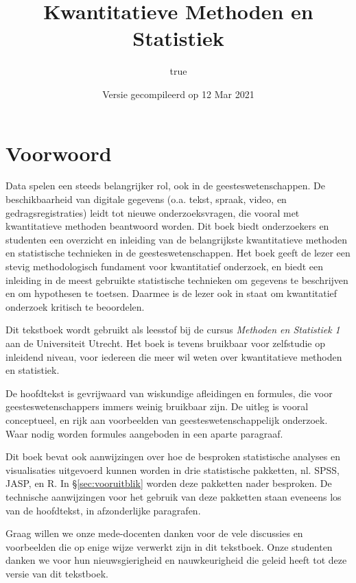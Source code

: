 \documentclass[
]{book}
\title{Kwantitatieve Methoden en Statistiek}
\author{true}
\date{Versie gecompileerd op 12 Mar 2021}
\begin{document}
\maketitle

{
\setcounter{tocdepth}{1}
\tableofcontents
}
\hypertarget{voorwoord}{%
\chapter*{Voorwoord}\label{voorwoord}}

Data spelen een steeds belangrijker rol, ook in de geesteswetenschappen.
De beschikbaarheid van digitale gegevens (o.a. tekst, spraak, video, en gedragsregistraties) leidt tot nieuwe onderzoeksvragen, die vooral met kwantitatieve methoden beantwoord worden.
Dit boek biedt onderzoekers en studenten een overzicht en inleiding van de belangrijkste kwantitatieve methoden en statistische technieken in de geesteswetenschappen. Het boek geeft de lezer een stevig methodologisch fundament voor kwantitatief onderzoek, en biedt een inleiding in de meest gebruikte statistische technieken om gegevens te beschrijven en om hypothesen te toetsen. Daarmee is de lezer ook in staat om kwantitatief onderzoek kritisch te beoordelen.

Dit tekstboek wordt gebruikt als leesstof bij de cursus \emph{Methoden en Statistiek 1} aan de Universiteit Utrecht. Het boek is tevens bruikbaar voor zelfstudie op inleidend niveau, voor iedereen die meer wil weten over kwantitatieve methoden en statistiek.

De hoofdtekst is gevrijwaard van wiskundige afleidingen en formules, die voor geesteswetenschappers immers weinig bruikbaar zijn. De uitleg is vooral conceptueel, en rijk aan voorbeelden van geesteswetenschappelijk onderzoek. Waar nodig worden formules aangeboden in een aparte paragraaf.

Dit boek bevat ook aanwijzingen over hoe de besproken statistische analyses en visualisaties uitgevoerd kunnen worden in drie statistische pakketten, nl. SPSS, JASP, en R. In §\ref{sec:vooruitblik} worden deze pakketten nader besproken. De technische aanwijzingen voor het gebruik van deze pakketten staan eveneens los van de hoofdtekst, in afzonderlijke paragrafen.

Graag willen we onze mede-docenten danken voor de vele discussies en voorbeelden die op enige wijze verwerkt zijn in dit tekstboek. Onze studenten danken we voor hun nieuwsgierigheid en nauwkeurigheid die geleid heeft tot deze versie van dit tekstboek.
\end{document}
